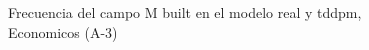 \begin{figure}[H]
    \centering
    
    \caption{Frecuencia del campo M built en el modelo real y tddpm, Economicos (A-3)}
    \label{frecuency-M Built-tddpm_mlp}
\end{figure}